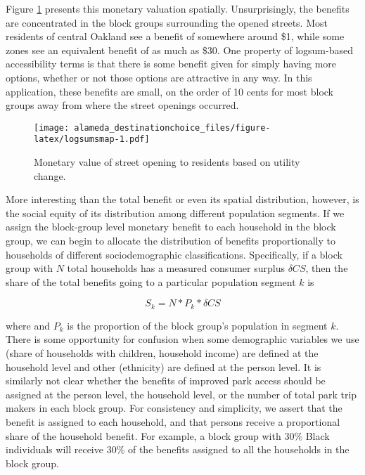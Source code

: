\documentclass[3p, authoryear]{elsarticle} %
\makeatletter
\def\maxwidth{\ifdim\Gin@nat@width>\linewidth\linewidth
\else\Gin@nat@width\fi}
\let\Oldincludegraphics\includegraphics
\renewcommand{\includegraphics}[1]{\Oldincludegraphics[width=\maxwidth]{#1}}
\makeatother
\begin{document}
Figure \ref{fig:logsumsmap} presents this monetary valuation spatially.
Unsurprisingly, the benefits are concentrated in the block groups surrounding
the opened streets. Most residents of central Oakland see a benefit of somewhere
around \$1, while some zones see an equivalent benefit of as much as \$30. One
property of logsum-based accessibility terms is that there is some benefit given
for simply having more options, whether or not those options are attractive in
any way. In this application, these benefits are small, on the order of 10 cents
for most block groups away from where the street openings occurred.

\begin{figure}
\centering
\texttt{[image: alameda\_destinationchoice\_files/figure-latex/logsumsmap-1.pdf]}
\caption{\label{fig:logsumsmap}Monetary value of street opening to residents based on utility change.}
\end{figure}

More interesting than the total benefit or even its spatial distribution, however,
is the social equity of its distribution among different population segments.
If we assign the block-group level monetary benefit to each household in the block
group, we can begin to allocate the distribution of benefits proportionally to
households of different sociodemographic classifications. Specifically, if a block
group with \(N\) total households has a measured consumer surplus \(\delta CS\), then the
share of the total benefits going to a particular population segment \(k\) is

\begin{equation}
  S_k = N * P_k * \delta CS
  \label{eq:cs-alloc}
\end{equation}

where and \(P_k\) is the proportion of the block group's population in segment \(k\).
There is some opportunity for confusion when some demographic variables we use
(share of households with children, household income) are defined at the
household level and other (ethnicity) are defined at the person level. It is similarly
not clear whether the benefits of improved park access should be assigned at
the person level, the household level, or the number of total park trip makers in
each block group. For consistency and simplicity, we assert that the benefit is
assigned to each household, and that persons receive a proportional share of the
household benefit. For example, a block group with 30\% Black individuals will
receive 30\% of the benefits assigned to all the households in the block group.
\end{document}
